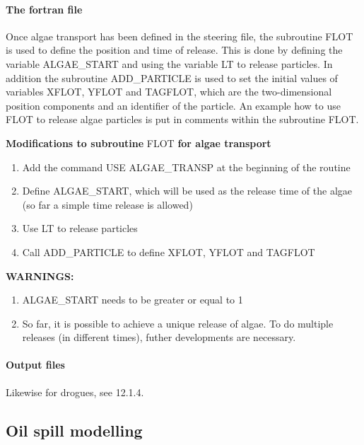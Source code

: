 \documentclass{article} %
\begin{document}
\paragraph{ The fortran file}

 Once algae transport has been defined in the steering file, the subroutine FLOT is used to define the position and time of release. This is done by defining the variable ALGAE\_START and using the variable LT to release particles. In addition the subroutine ADD\_PARTICLE is used to set the initial values of variables XFLOT, YFLOT and TAGFLOT, which are the two-dimensional position components and an identifier of the particle. An example how to use FLOT to release algae particles is put in comments within the subroutine FLOT.

 \textbf{Modifications to subroutine }FLOT\textbf{ for algae transport}

\begin{enumerate}
\item \textbf{ }Add the command USE ALGAE\_TRANSP at the beginning of the routine

\item  Define ALGAE\_START, which will be used as the release time of the algae (so far a simple time release is allowed)

\item  Use LT to release particles

\item  Call ADD\_PARTICLE to define XFLOT, YFLOT and TAGFLOT
\end{enumerate}

 \textbf{WARNINGS:}

\begin{enumerate}
\item  ALGAE\_START needs to be greater or equal to 1

\item  So far, it is possible to achieve a unique release of algae. To do multiple releases (in different times), futher developments are necessary.
\end{enumerate}


\paragraph{ Output files}

 Likewise for drogues, see 12.1.4.


\subsection{ Oil spill modelling}
\end{document}
